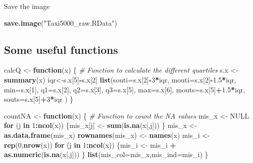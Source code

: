 \documentclass[
  18pt,
  a4paper]{article}
\newenvironment{Shaded}{\begin{snugshade}}{\end{snugshade}}
\newcommand{\CommentTok}[1]{\textcolor[rgb]{0.56,0.35,0.01}{\textit{#1}}}
\newcommand{\ControlFlowTok}[1]{\textcolor[rgb]{0.13,0.29,0.53}{\textbf{#1}}}
\newcommand{\DataTypeTok}[1]{\textcolor[rgb]{0.13,0.29,0.53}{#1}}
\newcommand{\DecValTok}[1]{\textcolor[rgb]{0.00,0.00,0.81}{#1}}
\newcommand{\FloatTok}[1]{\textcolor[rgb]{0.00,0.00,0.81}{#1}}
\newcommand{\KeywordTok}[1]{\textcolor[rgb]{0.13,0.29,0.53}{\textbf{#1}}}
\newcommand{\NormalTok}[1]{#1}
\newcommand{\OperatorTok}[1]{\textcolor[rgb]{0.81,0.36,0.00}{\textbf{#1}}}
\newcommand{\OtherTok}[1]{\textcolor[rgb]{0.56,0.35,0.01}{#1}}
\newcommand{\StringTok}[1]{\textcolor[rgb]{0.31,0.60,0.02}{#1}}
\begin{document}
Save the image

\begin{Shaded}
\begin{Highlighting}[]
\KeywordTok{save.image}\NormalTok{(}\StringTok{"Taxi5000_raw.RData"}\NormalTok{)}
\end{Highlighting}
\end{Shaded}

\hypertarget{some-useful-functions}{%
\subsection{Some useful functions}\label{some-useful-functions}}

\begin{Shaded}
\begin{Highlighting}[]
\NormalTok{calcQ <-}\StringTok{ }\ControlFlowTok{function}\NormalTok{(x) \{ }\CommentTok{# Function to calculate the different quartiles}
\NormalTok{  s.x <-}\StringTok{ }\KeywordTok{summary}\NormalTok{(x)}
\NormalTok{  iqr<-s.x[}\DecValTok{5}\NormalTok{]}\OperatorTok{-}\NormalTok{s.x[}\DecValTok{2}\NormalTok{]}
  \KeywordTok{list}\NormalTok{(}\DataTypeTok{souti=}\NormalTok{s.x[}\DecValTok{2}\NormalTok{]}\OperatorTok{-}\DecValTok{3}\OperatorTok{*}\NormalTok{iqr, }\DataTypeTok{mouti=}\NormalTok{s.x[}\DecValTok{2}\NormalTok{]}\OperatorTok{-}\FloatTok{1.5}\OperatorTok{*}\NormalTok{iqr, }\DataTypeTok{min=}\NormalTok{s.x[}\DecValTok{1}\NormalTok{], }\DataTypeTok{q1=}\NormalTok{s.x[}\DecValTok{2}\NormalTok{], }\DataTypeTok{q2=}\NormalTok{s.x[}\DecValTok{3}\NormalTok{], }
       \DataTypeTok{q3=}\NormalTok{s.x[}\DecValTok{5}\NormalTok{], }\DataTypeTok{max=}\NormalTok{s.x[}\DecValTok{6}\NormalTok{], }\DataTypeTok{mouts=}\NormalTok{s.x[}\DecValTok{5}\NormalTok{]}\OperatorTok{+}\FloatTok{1.5}\OperatorTok{*}\NormalTok{iqr, }\DataTypeTok{souts=}\NormalTok{s.x[}\DecValTok{5}\NormalTok{]}\OperatorTok{+}\DecValTok{3}\OperatorTok{*}\NormalTok{iqr ) }
\NormalTok{\}}

\NormalTok{countNA <-}\StringTok{ }\ControlFlowTok{function}\NormalTok{(x) \{ }\CommentTok{# Function to count the NA values}
\NormalTok{  mis_x <-}\StringTok{ }\OtherTok{NULL}
  \ControlFlowTok{for}\NormalTok{ (j }\ControlFlowTok{in} \DecValTok{1}\OperatorTok{:}\KeywordTok{ncol}\NormalTok{(x)) \{mis_x[j] <-}\StringTok{ }\KeywordTok{sum}\NormalTok{(}\KeywordTok{is.na}\NormalTok{(x[,j])) \}}
\NormalTok{  mis_x <-}\StringTok{ }\KeywordTok{as.data.frame}\NormalTok{(mis_x)}
  \KeywordTok{rownames}\NormalTok{(mis_x) <-}\StringTok{ }\KeywordTok{names}\NormalTok{(x)}
\NormalTok{  mis_i <-}\StringTok{ }\KeywordTok{rep}\NormalTok{(}\DecValTok{0}\NormalTok{,}\KeywordTok{nrow}\NormalTok{(x))}
  \ControlFlowTok{for}\NormalTok{ (j }\ControlFlowTok{in} \DecValTok{1}\OperatorTok{:}\KeywordTok{ncol}\NormalTok{(x)) \{mis_i <-}\StringTok{ }\NormalTok{mis_i }\OperatorTok{+}\StringTok{ }\KeywordTok{as.numeric}\NormalTok{(}\KeywordTok{is.na}\NormalTok{(x[,j])) \}}
  \KeywordTok{list}\NormalTok{(}\DataTypeTok{mis_col=}\NormalTok{mis_x,}\DataTypeTok{mis_ind=}\NormalTok{mis_i) }
\NormalTok{\}}


\end{Highlighting}
\end{Shaded}
\end{document}

